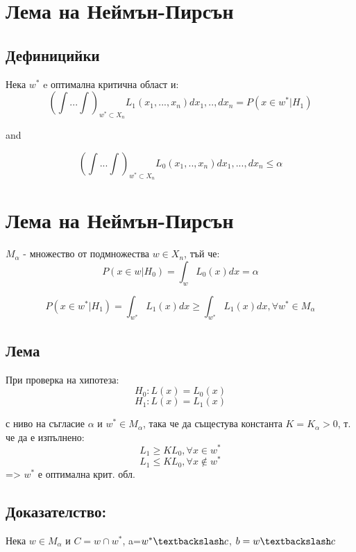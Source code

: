 \documentclass{article}
\begin{document}
\section{Лема на Неймън-Пирсън}

\subsection{Дефиницийки}
Нека $w^{*}$ e оптимална критична област и: \\

$$(\int ... \int)_{w^{*} \subset X_n} L_1(x_{1},...,x_n) dx_{1},..,dx_{n}=P(x \in w^{*} | H_{1})$$

and

$$(\int ... \int)_{w^{*} \subset X_n} L_{0}(x_1,..,x_n) dx_{1},...,dx_{n} \leq \alpha$$

\section{Лема на Неймън-Пирсън}
$M_{\alpha}$ - множество от подмножества $w \in X_{n}$, тъй че:
$$P(x \in w | H_{0}) = \int_{w} L_0(x)dx=\alpha$$

$$P(x \in w^{*} | H_{1}) = \int_{w^{*}} L_{1}(x) dx \geq \int_{w^{*}} L_{1}(x) dx, \forall w^{*} \in M_{\alpha}$$

\subsection{Лема}

При проверка на хипотеза:
$$H_{0}: L(x)=L_0(x)$$
$$H_{1}: L(x)=L_1(x)$$

с ниво на съгласие $\alpha$ и $w^{*} \in M_{\alpha}$, така че да същестува константа $K=K_{\alpha}>0$, т. че да е изпълнено:
$$L_{1} \geq K L_{0} , \forall x \in w^{*}$$
$$L_{1} \leq K L_{0}, \forall x \notin w^{*}$$
=> $w^{*}$ е оптимална крит. обл.


\subsection{Доказателство:}
Нека $w \in M_{\alpha}$ и $C=w \cap w^{*}$, a=$w^{*} \textbackslash c$, $b=w\textbackslash c$


\end{document}
